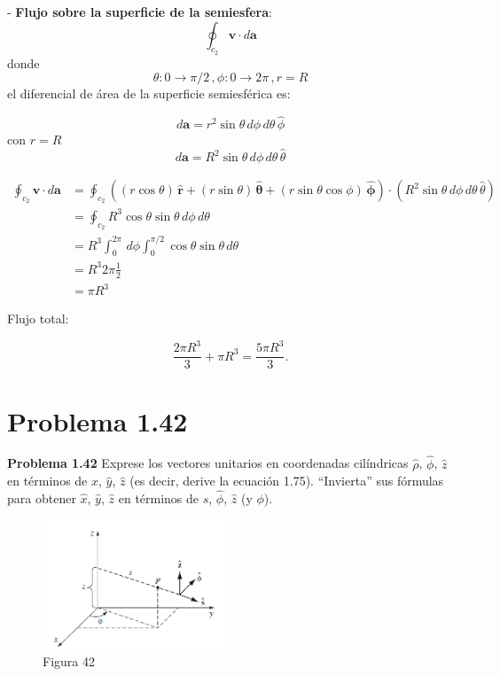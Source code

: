 \documentclass[12pt]{article}
\begin{document}
- \textbf{Flujo sobre la superficie de la semiesfera}:
\[\oint_{c_2} \mathbf{v} \cdot d\mathbf{a}\]
donde 
\[\theta :0 \rightarrow\pi/2 \,, \phi:0 \rightarrow 2\pi \,, r = R\]
el diferencial de área de la superficie semiesférica es: 

\[d\mathbf{a} = r^2\sin\theta \, d\phi \, d\theta\, \hat{\phi }\] con \(r = R\) 
\[d\mathbf{a} = R^2 \sin\theta \, d\phi \, d\theta\, \hat{\theta }\]

\begin{align*}
\oint_{c_2 } \mathbf{v} \cdot d \mathbf{a}  &= \oint_{c_2} ((r\cos\theta)\,\hat{\mathbf{r}} + (r\sin\theta)\,\hat{\boldsymbol{\theta}} + (r\sin\theta\cos\phi)\,\hat{\boldsymbol{\phi}})\cdot(R^2 \sin\theta \, d\phi \, d\theta\, \hat{\theta }) \\
& = \oint_{c_2} R^3\cos\theta \sin\theta \, d\phi \, d\theta \\
& = R^3 \int_{0}^{2\pi} \, d\phi \int_{0}^{\pi/2} \cos\theta \sin\theta \, d\theta \\
& = R^3 2\pi \frac{1}{2} \\
& = \pi R^3
\end{align*}

Flujo total:  

\[
\frac{2\pi R^3}{3} + \pi R^3 = \boxed{\frac{5\pi R^3}{3}}.
\]  
\section*{\color{blue} Problema 1.42}
\textbf{Problema 1.42} Exprese los vectores unitarios en coordenadas cilíndricas \(\hat{\rho}\), \(\hat{\phi}\), \(\hat{z}\) en términos de \(\hat{x}\), \(\hat{y}\), \(\hat{z}\) (es decir, derive la ecuación 1.75). ``Invierta'' sus fórmulas para obtener \(\hat{x}\), \(\hat{y}\), \(\hat{z}\) en términos de \(\hat{s}\), \(\hat{\phi}\), \(\hat{z}\) (y \(\phi\)).

\begin{figure}[H]
    \centering
    \includegraphics[width=0.5\textwidth]{imagenes/punto_42.png} 
    \captionsetup{labelformat=empty}
    \caption{Figura 42}
\end{figure}
\end{document}
